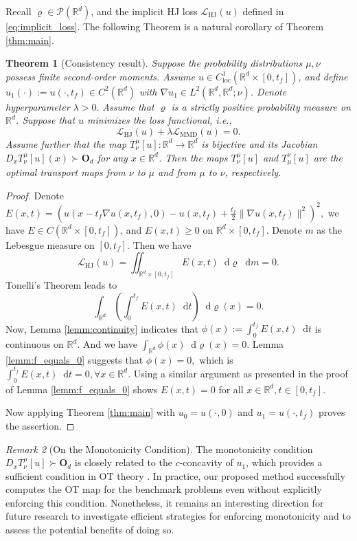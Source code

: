 \documentclass{article} %
\theoremstyle{plain}
\newtheorem{theorem}{Theorem}[section]
\theoremstyle{definition}
\theoremstyle{remark}
\newtheorem{remark}[theorem]{Remark}
\newcommand*\diff{\mathop{}\!\mathrm{d}}
\begin{document}
Recall $\varrho\in\mathscr{P}(\mathbb{R}^d)$, and the implicit HJ loss $\mathcal L_{\text{HJ}}(u)$ defined in \eqref{eq:implicit_loss}. The following Theorem is a natural corollary of Theorem \ref{thm:main}.
\begin{theorem}[Consistency result]
  Suppose the probability distributions $\mu, \nu$ possess finite second-order moments. Assume $u\in C^1_{\text{loc}}(\mathbb{R}^d\times[0, t_f])$, and define $u_1(\cdot) := u(\cdot, t_f) \in C^2(\mathbb{R}^d)$ with $\nabla u_1 \in L^2(\mathbb{R}^d, \mathbb{R}^d; \nu)$. Denote  hyperparameter $\lambda>0.$ Assume that $\varrho$ is a strictly positive probability measure on $\mathbb{R}^d$. Suppose that $u$ minimizes the loss functional, i.e.,
  \[ \mathcal L_{\text{HJ}}(u) + \lambda \mathcal L_{\text{MMD}}(u) = 0.\] 
  Assume further that the map $T_\nu^\mu[u] : \mathbb{R}^d \to \mathbb{R}^d$ is bijective and its Jacobian $D_x T_\nu^\mu[u](x) \succ \mathbf{O}_d$ for any $x\in\mathbb{R}^d$. Then the maps $T_\nu^\mu[u]$ and $T_\mu^\nu[u]$ are the optimal transport maps from $\nu$ to $\mu$ and from $\mu$ to $\nu$, respectively.
\end{theorem}
\begin{proof}
Denote $E(x, t) = (u(x-t_f\nabla u(x, t_f), 0) - u(x, t_f) + \frac{t_f}{2}\|\nabla u(x, t_f)\|^2)^2,$ we have $E\in C(\mathbb{R}^d\times [0, t_f])$, and $E(x, t)\geq 0$ on $\mathbb{R}^d\times[0, t_f]$. Denote $m$ as the Lebesgue measure on $[0, t_f].$ Then we have 
\[ \mathcal L_{\text{HJ}}(u) = \iint_{\mathbb{R}^d\times [0, t_f]} E(x, t) \diff\varrho \diff m = 0. \] 
Tonelli's Theorem \cite{fremlin2000measure} leads to 
\[ \int_{\mathbb{R}^d} \left(\int_0^{t_f} E(x,t) \diff t \right) \diff \varrho(x) = 0. \]
Now, Lemma \ref{lemm:continuity} indicates that $\phi(x):=\int_0^{t_f} E(x,t) \diff t$ is continuous on $\mathbb{R}^d$. And we have $\int_{\mathbb{R}^d} \phi(x) \diff \varrho(x) = 0$. Lemma \ref{lemm:f_equals_0} suggests that $\phi(x)= 0,$ which is $\int_0^{t_f} E(x, t) \diff t = 0, \forall x\in\mathbb{R}^d$. Using a similar argument as presented in the proof of Lemma \ref{lemm:f_equals_0} shows $E(x, t) = 0$ for all $x\in\mathbb{R}^d, t\in[0, t_f]$. 

Now applying Theorem \ref{thm:main} with $u_0=u(\cdot, 0)$ and $u_1=u(\cdot, t_f)$ proves the assertion.
\end{proof}

\begin{remark}[On the Monotonicity Condition]\label{remark:monotonicity_cond}
  The monotonicity condition $D_x T_\nu^\mu[u] \succ \mathbf{O}_d$ is closely related to the $c$-concavity of $u_1$, which provides a sufficient condition in OT theory \citep{villani2008optimal, santambrogio2015optimal}. In practice, our proposed method successfully computes the OT map for the benchmark problems even without explicitly enforcing this condition. Nonetheless, it remains an interesting direction for future research to investigate efficient strategies for enforcing monotonicity and to assess the potential benefits of doing so.
\end{remark}
\end{document}
